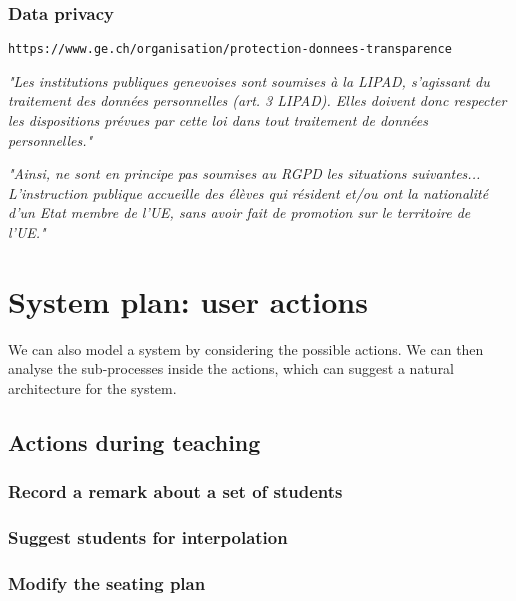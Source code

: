 \documentclass[10pt]{article}
\begin{document}
\subsubsection{Data privacy} \label{dataprivacy}

\texttt{https://www.ge.ch/organisation/protection-donnees-transparence}

\begin{center} 
\emph{"Les institutions publiques genevoises sont soumises à la LIPAD, s'agissant du traitement des données personnelles (art. 3 LIPAD). Elles doivent donc respecter les dispositions prévues par cette loi dans tout traitement de données personnelles."}\cite[p. 1]{PPDT18}
\end{center}

\begin{center} 
\emph{"Ainsi, ne sont en principe pas soumises au RGPD les situations suivantes... L’instruction publique accueille des élèves qui résident et/ou ont la nationalité d’un Etat membre de l’UE, sans avoir fait de promotion sur le territoire de l’UE."}\cite[p. 3]{PPDT18}
\end{center}



\section{System plan: user actions} \label{actions}

We can also model a system by considering the possible actions. We can then analyse the sub-processes inside the actions, which can suggest a natural architecture for the system.



\subsection{Actions during teaching}

\subsubsection{Record a remark about a set of students}

\subsubsection{Suggest students for interpolation}

\subsubsection{Modify the seating plan}
 
\end{document}
